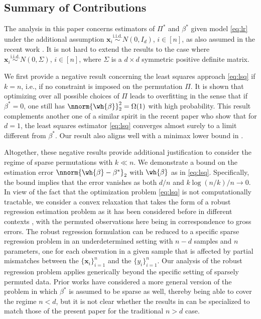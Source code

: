 \documentclass[11pt]{article}
\def\x{\mathbf{x}}
\begin{document}
\subsection{Summary of Contributions}
The analysis in this paper concerns estimators of $\Pi^*$ and $\beta^*$ given model \eqref{eq:lr} under the additional assumption 
$\x_i \overset{\text{i.i.d.}}{\sim} N(0, I_d)$, $i \in [n]$, as also assumed in the recent work \cite{Pananjady2016}. It is not hard to extend the results to the case where $\x_i \overset{\text{i.i.d.}}{\sim} N(0, \Sigma)$, $i \in [n]$, where $\Sigma$ is a $d \times d$ symmetric positive definite matrix.  

We first provide a negative result concerning the least squares approach \eqref{eq:lsq} if $k = n$, i.e., if no constraint is imposed on the permutation $\Pi$. It is shown that optimizing over all possible choices of $\Pi$ leads to overfitting in the sense that if $\beta^* = 0$, one still has  $\nnorm{\wh{\beta}}_2^2 = \Omega(1)$ with high probability. This result complements another one of a similar spirit in the recent paper \cite{Abid2017} who show that for $d = 1$, the least squares estimator \eqref{eq:lsq} converges almost surely to a limit different from $\beta^*$. Our result also aligns well with a minimax lower bound in \cite{Pananjady2017}. 

Altogether, these negative results provide additional justification to consider the regime of sparse permutations with $k \ll n$.
We demonstrate a bound on the estimation error $\nnorm{\wh{\beta} - \beta^*}_2$ with $\wh{\beta}$ as in \eqref{eq:lsq}. Specifically, the bound implies that the error vanishes as both $d/n$ and $k \log(n/k)/n \rightarrow 0$. In view of the fact that the optimization problem \eqref{eq:lsq} is not computationally tractable, we consider a convex relaxation that takes the form of a robust regression estimation problem as it has been considered before in different contexts \cite{Nguyen2013, She2012, FoygelMackey}, with the permuted observations here being in correspondence to gross errors. The robust regression formulation can be reduced to a specific sparse regression problem in an underdetermined setting with $n - d$ samples and $n$ parameters, one for each observation in a given sample that is affected by partial mismatches between the $\{\x_i\}_{i = 1}^n$ and the $\{ y_i\}_{i = 1}^n$. Our analysis of the robust regression problem applies generically beyond the specific setting of sparsely permuted data. Prior works \cite{Nguyen2013, FoygelMackey} have considered a more general version of the problem in which $\beta^*$ is assumed to be sparse as well, thereby being able to cover the regime $n < d$, but it is not clear whether the results in \cite{Nguyen2013, FoygelMackey} can be specialized to match those of the present paper for the traditional $n > d$ case.
\end{document}
